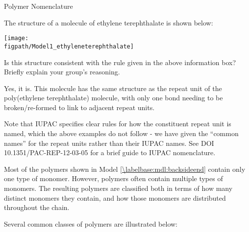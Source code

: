 \begin{activity}{Polymer Nomenclature}
\begin{ctqs}
	\question The structure of a molecule of ethylene terephthalate is shown below:
	
		\centerline{\texttt{[image: \\figpath/Model1\_ethyleneterephthalate]}}
		
		Is this structure consistent with the rule given in the above information box?  Briefly explain your group's reasoning.
		
		\begin{solution}[0.75in]
			Yes, it is.  This molecule has the same structure as the repeat unit of the poly(ethylene terephthalate) molecule, with only one bond needing to be broken/re-formed to link to adjacent repeat units.
			
			Note that IUPAC specifies clear rules for how the constituent repeat unit is named, which the above examples do not follow - we have given the ``common names'' for the repeat units rather than their IUPAC names.  See DOI 10.1351/PAC-REP-12-03-05 for a brief guide to IUPAC nomenclature.
			
		\end{solution}

\end{ctqs}


\clearpage


\begin{model}[Composition]
\label{\labelbase:mdl:composition}

	Most of the polymers shown in Model \ref{\labelbase:mdl:backsideend} contain only one type of monomer.  However, polymers often contain multiple types of monomers.  The resulting polymers are classified both in terms of how many distinct monomers they contain, and how those monomers are distributed throughout the chain.
	
	Several common classes of polymers are illustrated below:
	

\end{model}
\end{activity}
